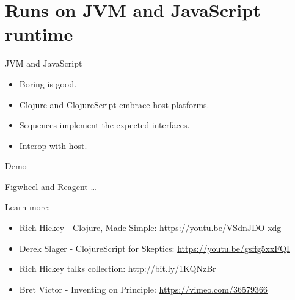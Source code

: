 \documentclass[presentation]{beamer}
\begin{document}
\section{Runs on JVM and JavaScript runtime}
\label{sec-4}

\begin{frame}[label=sec-4-1]{JVM and JavaScript}
\begin{itemize}
\item Boring is good.
\item Clojure and ClojureScript embrace host platforms.
\item Sequences implement the expected interfaces.
\item Interop with host.
\end{itemize}
\end{frame}

\begin{frame}[label=sec-4-2]{Demo}
\begin{alertblock}{Figwheel and Reagent}
\ldots{}
\end{alertblock}
\end{frame}

\begin{frame}[label=sec-4-3]{Learn more:}
\begin{itemize}
\item Rich Hickey - Clojure, Made Simple: \url{https://youtu.be/VSdnJDO-xdg}
\item Derek Slager - ClojureScript for Skeptics: \url{https://youtu.be/gsffg5xxFQI}
\item Rich Hickey talks collection: \url{http://bit.ly/1KQNzBr}
\item Bret Victor - Inventing on Principle: \url{https://vimeo.com/36579366}
\end{itemize}
\end{frame}
\end{document}
